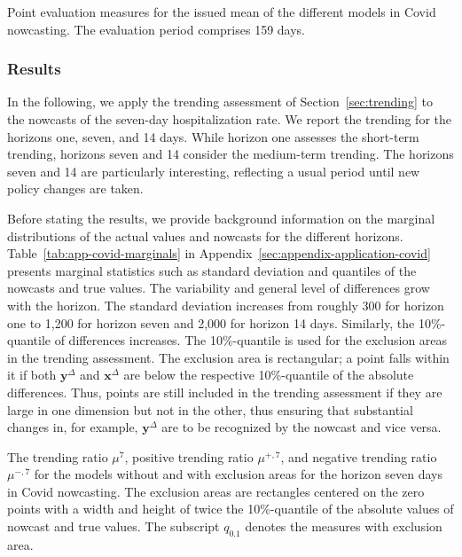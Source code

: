 \documentclass[pdflatex]{sn-jnl}
\theoremstyle{plain}%
\theoremstyle{definition}
\newcommand{\diffx}{\mathbf{x}^{\Delta}}
\newcommand{\diffy}{\mathbf{y}^{\Delta}}
\newcommand{\acc}{\mu}
\newcommand{\accl}[1][l]{\mu^{#1}}
\newcommand{\accpl}[1][l]{\acc^{+,#1}}
\newcommand{\accml}[1][l]{\acc^{-,#1}}
\begin{document}
\begin{table}[]
    \centering
    
    \caption[Point evaluation measures for the issued mean of the different models in Covid nowcasting.]{Point evaluation measures for the issued mean of the different models in Covid nowcasting. The evaluation period comprises 159 days. }
    \label{tab:app-covid-rmse}
\end{table}

\subsubsection*{Results}

In the following, we apply the trending assessment of Section~\ref{sec:trending} to the nowcasts of the seven-day hospitalization rate.
We report the trending for the horizons one, seven, and 14 days.
While horizon one assesses the short-term trending, horizons seven and 14 consider the medium-term trending.
The horizons seven and 14 are particularly interesting, reflecting a usual period until new policy changes are taken.

Before stating the results, we provide background information on the marginal distributions of the actual values and nowcasts for the different horizons.
Table~\ref{tab:app-covid-marginals} in Appendix~\ref{sec:appendix-application-covid} presents marginal statistics such as standard deviation and quantiles of the nowcasts and true values.
The variability and general level of differences grow with the horizon.
The standard deviation increases from roughly 300 for horizon one to 1,200 for horizon seven and 2,000 for horizon 14 days.
Similarly, the 10\%-quantile of differences increases.
The 10\%-quantile is used for the exclusion areas in the trending assessment.
The exclusion area is rectangular; a point falls within it if both $\diffy$ and $\diffx$ are below the respective 10\%-quantile of the absolute differences.
Thus, points are still included in the trending assessment if they are large in one dimension but not in the other, thus ensuring that substantial changes in, for example, $\diffy$ are to be recognized by the nowcast and vice versa.

\begin{table}
    \centering
    \tiny
    
    \caption[The trending ratios for Covid nowcasting.]{The trending ratio $\accl[7]$, positive trending ratio $\accpl[7]$, and negative trending ratio $\accml[7]$ for the models without and with exclusion areas for the horizon seven days in Covid nowcasting. The exclusion areas are rectangles centered on the zero points with a width and height of twice the 10\%-quantile of the absolute values of nowcast and true values. The subscript $q_{0.1}$ denotes the measures with exclusion area. }
    \label{tab:app-covid-trending-ratios-lag-7}
\end{table}
\end{document}
